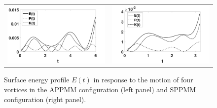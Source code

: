 \documentclass[a4paper,11pt]{article}
\begin{document}
\begin{figure}[!h]
\centering
\begin{tabular}{cc}
\includegraphics[width=.5\textwidth]{energy_profile_mu_pt2_F_pt2_ppmm} &
\includegraphics[width=.5\textwidth]{energy_profile_mu_pt2_F_pt2_ppmm_sym}
\end{tabular}
\caption{\small Surface energy profile $E(t)$ in response to the motion of four vortices in the APPMM configuration (left panel) and SPPMM configuration (right panel).}
\label{fig:eprof_ppmm}
\end{figure}
\end{document}
